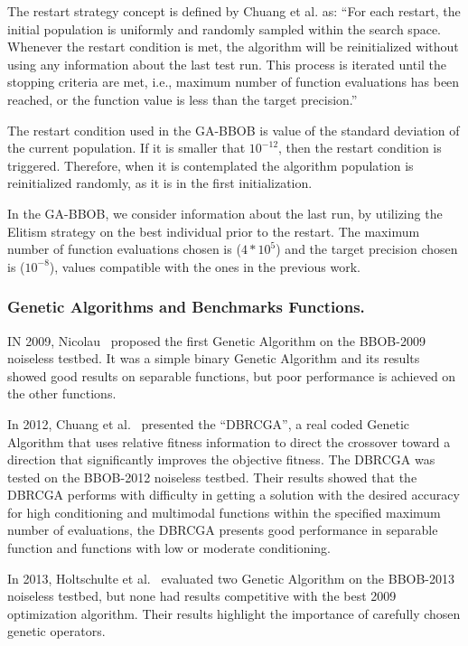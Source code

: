 The restart strategy concept is defined by Chuang et al. as: ``For each restart, the initial population  is uniformly and randomly sampled within the search space. Whenever the restart condition is met, the algorithm will be reinitialized without using any information about the last test run. This process is iterated until the stopping criteria are met, i.e., maximum number of function evaluations has been reached, or the function value is less than the target precision.''

The restart condition used in the GA-BBOB is value of the standard deviation of the current population. If it is smaller that $10^{-12}$, then the restart condition is triggered. Therefore, when it is contemplated the algorithm population is reinitialized randomly, as it is in the first initialization. 

In the GA-BBOB, we consider information about the last run, by utilizing the Elitism strategy on the best individual prior to the restart. The maximum number of function evaluations chosen is ($4 * 10^5$) and the target precision chosen is ($10^{-8}$), values compatible with the ones in the previous work.

\subsubsection*{Genetic Algorithms and Benchmarks Functions.}

IN 2009, Nicolau~\cite{nicolau2009application} proposed the first Genetic Algorithm on the BBOB-2009 noiseless testbed. It was a simple binary Genetic Algorithm and its results showed good results on separable functions, but poor performance is achieved on the other functions.

In 2012, Chuang et al.~\cite{chuang2012black} presented the ``DBRCGA'', a real coded Genetic Algorithm that uses relative fitness information to direct the crossover toward a direction that significantly improves the objective fitness. The DBRCGA was tested on the BBOB-2012 noiseless testbed. Their results showed that the DBRCGA performs with difficulty in getting a solution with the desired accuracy for high conditioning and multimodal functions within the specified maximum number of evaluations, the DBRCGA presents good performance in separable function and functions with low or moderate conditioning.

In 2013, Holtschulte et al.~\cite{holtschulte2013benchmarking} evaluated two Genetic Algorithm on the BBOB-2013 noiseless testbed, but none had results competitive with the best 2009 optimization algorithm. Their results highlight the importance of carefully chosen genetic operators.

